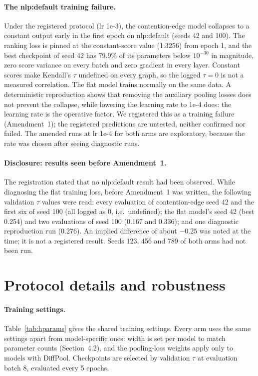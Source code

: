 \documentclass{article}
\begin{document}
\paragraph{The nlp:default training failure.} Under the registered protocol (lr 1e-3), the
contention-edge model collapses to a constant output early in the first epoch on nlp:default (seeds 42
and 100). The ranking loss is pinned at the constant-score value (1.3256) from epoch 1, and the best
checkpoint of seed 42 has 79.9\% of its parameters below $10^{-30}$ in magnitude, zero score variance on
every batch and zero gradient in every layer. Constant scores make Kendall's $\tau$ undefined on every
graph, so the logged $\tau = 0$ is not a measured correlation. The flat model trains normally on the same
data. A deterministic reproduction shows that removing the auxiliary pooling losses does not prevent the
collapse, while lowering the learning rate to 1e-4 does: the learning rate is the operative factor. We
registered this as a training failure (Amendment~1); the registered predictions are untested, neither
confirmed nor failed. The amended runs at lr 1e-4 for both arms are exploratory, because the rate was
chosen after seeing diagnostic runs.

\paragraph{Disclosure: results seen before Amendment~1.} The registration stated that no nlp:default
result had been observed. While diagnosing the flat training loss, before Amendment~1 was written, the
following validation $\tau$ values were read: every evaluation of contention-edge seed 42 and the first
six of seed 100 (all logged as 0, i.e.\ undefined); the flat model's seed 42 (best 0.254) and two
evaluations of seed 100 (0.167 and 0.336); and one diagnostic reproduction run (0.276). An implied
difference of about $-0.25$ was noted at the time; it is not a registered result. Seeds 123, 456 and 789
of both arms had not been run.

\section{Protocol details and robustness}
\label{app:robustness}
\paragraph{Training settings.} Table~\ref{tab:hparams} gives the shared training settings. Every arm uses
the same settings apart from model-specific ones: width is set per model to match parameter counts
(Section~4.2), and the pooling-loss weights apply only to models with DiffPool.
Checkpoints are selected by validation $\tau$ at evaluation batch 8, evaluated every 5 epochs.
\end{document}
